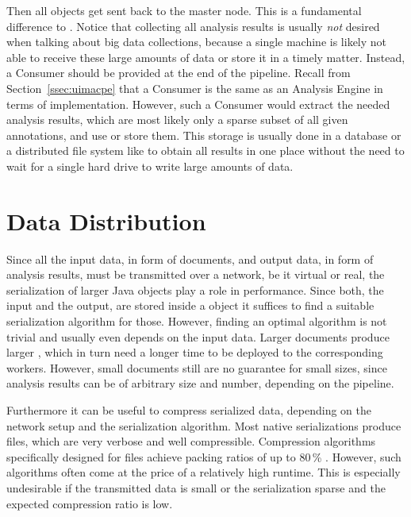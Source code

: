 Then all \cas{} objects get sent back to the master node. This is a fundamental difference to \uimaas{}. Notice that collecting all analysis results is usually \emph{not} desired when talking about big data collections, because a single machine is likely not able to receive these large amounts of data or store it in a timely matter. Instead, a \cas{} Consumer should be provided at the end of the pipeline. Recall from Section~\ref{ssec:uimacpe} that a \cas{} Consumer is the same as an Analysis Engine in terms of implementation. However, such a \cas{} Consumer would extract the needed analysis results, which are most likely only a sparse subset of all given annotations, and use or store them. This storage is usually done in a database or a distributed file system like \hdfs{} to obtain all results in one place without the need to wait for a single hard drive to write large amounts of data.

\section{Data Distribution}
\label{sec:distribution}
Since all the input data, in form of documents, and output data, in form of analysis results, must be transmitted over a network, be it virtual or real, the serialization of larger Java objects play a role in performance. Since both, the input and the output, are stored inside a \cas{} object it suffices to find a suitable serialization algorithm for those. However, finding an optimal algorithm is not trivial and usually even depends on the input data. Larger documents produce larger \cas{}, which in turn need a longer time to be deployed to the corresponding \spark{} workers. However, small documents still are no guarantee for small \cas{} sizes, since analysis results can be of arbitrary size and number, depending on the \uima{} pipeline. 

Furthermore it can be useful to compress serialized data, depending on the network setup and the serialization algorithm. Most native \uima{} serializations produce \xml{} files, which are very verbose and well compressible. Compression algorithms specifically designed for \xml{} files achieve packing ratios of up to 80\,\% \cite{girardot2005system,min2003xpress,sakr2009xml}. However, such algorithms often come at the price of a relatively high runtime. This is especially undesirable if the transmitted data is small or the serialization sparse and the expected compression ratio is low.

